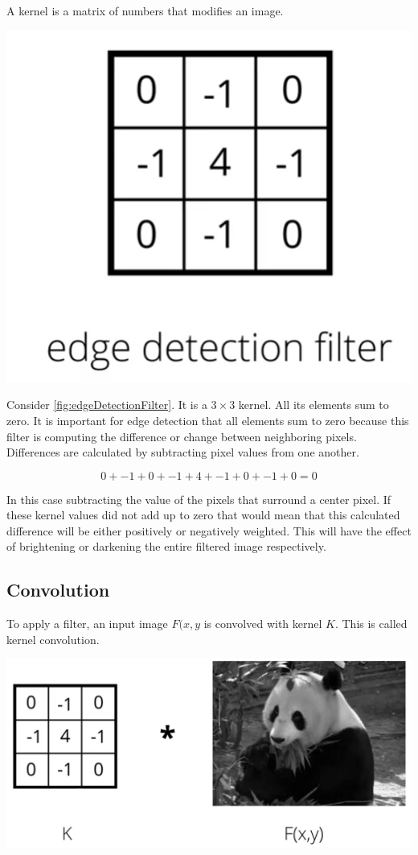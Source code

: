 A kernel is a matrix of numbers that modifies an image. 

\includegraphics[width=0.5\linewidth]{img//cnn//concepts/edgedetection.png}
\label{fig:edgeDetectionFilter}

Consider \autoref{fig:edgeDetectionFilter}. It is a \(3 \times 3\) kernel. All its elements sum to zero. It is important for edge detection that all elements sum to zero because this filter is computing the difference or change between neighboring pixels. Differences are calculated by subtracting pixel values from one another. 

\[0 + -1 + 0 + -1 + 4 + -1 + 0 + -1 + 0 = 0\]

In this case subtracting the value of the pixels that surround a center pixel. If these kernel values did not add up to zero that would mean that this calculated difference will be either positively or negatively weighted. This will have the effect of brightening or darkening the entire filtered image respectively.

\subsection{Convolution}
To apply a filter, an input image \(F(x,y\) is convolved with kernel \(K\). This is called kernel convolution. 

\includegraphics[width=1\linewidth]{img//cnn//concepts/image5.png}

